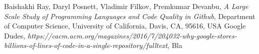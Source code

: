 \documentclass[12pt,a4paper]{report}
\begin{document}
\begin{thebibliography}{9}

  Baishakhi Ray, Daryl Posnett, Vladimir Filkov, Premkumar Devanbu,
  \textit{A Large Scale Study of Programming Languages
and Code Quality in Github},
  Department of Computer Science, University of California, Davis, CA, 95616, USA
  Google Dudes,
  \textit{https://cacm.acm.org/magazines/2016/7/204032-why-google-stores-billions-of-lines-of-code-in-a-single-repository/fulltext}, Bla

\end{thebibliography}
\end{document}
